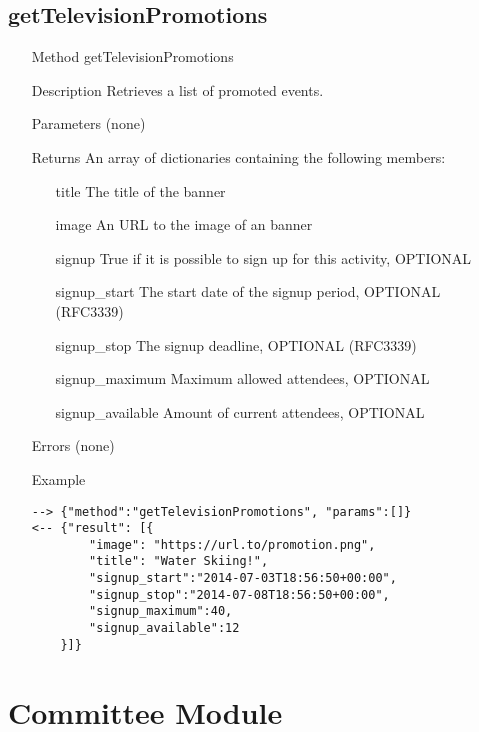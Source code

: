 \documentclass[a4paper]{scrreprt}
\begin{document}
\subsection{getTelevisionPromotions}
\begin{enumerate}
\item[Method] getTelevisionPromotions
\item[Description] Retrieves a list of promoted events.
\item[Parameters] (none)
\item[Returns] An array of dictionaries containing the following members:
\begin{enumerate}
    \item[title] The title of the banner
	\item[image] An URL to the image of an banner
    \item[signup] True if it is possible to sign up for this activity, OPTIONAL
    \item[signup\_start] The start date of the signup period, OPTIONAL (RFC3339)
    \item[signup\_stop] The signup deadline, OPTIONAL (RFC3339)
    \item[signup\_maximum] Maximum allowed attendees, OPTIONAL
    \item[signup\_available] Amount of current attendees, OPTIONAL
	\end{enumerate}
\item[Errors] (none)
\item[Example]
\begin{lstlisting}
--> {"method":"getTelevisionPromotions", "params":[]}
<-- {"result": [{ 
        "image": "https://url.to/promotion.png",
        "title": "Water Skiing!",
        "signup_start":"2014-07-03T18:56:50+00:00",
        "signup_stop":"2014-07-08T18:56:50+00:00",
        "signup_maximum":40,
        "signup_available":12
    }]}
\end{lstlisting}
\end{enumerate}



\clearpage

\section{Committee Module}
\end{document}
